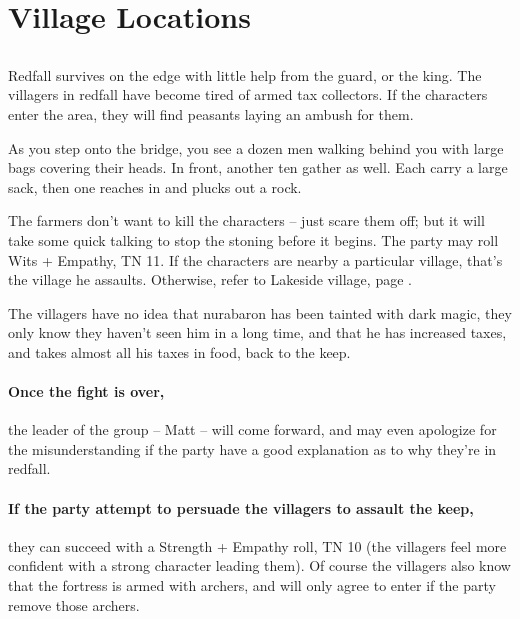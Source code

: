 \section{Village Locations}

\subsection{}

\begin{multicols}{2}


\noindent
Redfall survives on the \gls{edge} with little help from the \gls{guard}, or the \gls{king}.
The villagers in \gls{redfall} have become tired of armed tax collectors.
If the characters enter the area, they will find peasants laying an ambush for them.

\begin{boxtext}

  As you step onto the bridge, you see a dozen men walking behind you with large bags covering their heads.  In front, another ten gather as well.  Each carry a large sack, then one reaches in and plucks out a rock.

\end{boxtext}

The farmers don't want to kill the characters -- just scare them off; but it will take some quick talking to stop the stoning before it begins.  The party may roll Wits + Empathy, TN 11.
If the characters are nearby a particular village, that's the village he assaults.
Otherwise, refer to Lakeside village, page \pageref{lakeside}.

The villagers have no idea that \gls{nurabaron} has been tainted with dark magic, they only know they haven't seen him in a long time, and that he has increased taxes, and takes almost all his taxes in food, back to the keep.


\paragraph{Once the fight is over,}
the leader of the group -- Matt -- will come forward, and may even apologize for the misunderstanding if the party have a good explanation as to why they're in \gls{redfall}.

\paragraph{If the party attempt to persuade the villagers to assault the keep,}
they can succeed with a Strength + Empathy roll, TN 10
(the villagers feel more confident with a strong character leading them).
Of course the villagers also know that the fortress is armed with archers, and will only agree to enter if the party remove those archers.


\end{multicols}
